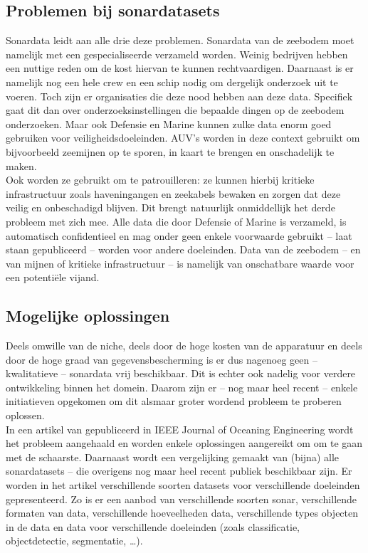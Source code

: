 \subsection{Problemen bij sonardatasets}

Sonardata leidt aan alle drie deze problemen. Sonardata van de zeebodem moet namelijk met een gespecialiseerde  verzameld worden. Weinig bedrijven hebben een nuttige reden om de kost hiervan te kunnen rechtvaardigen. Daarnaast is er namelijk nog een hele crew en een schip nodig om dergelijk onderzoek uit te voeren. Toch zijn er organisaties die deze nood hebben aan deze data. Specifiek gaat dit dan over onderzoeksinstellingen die bepaalde dingen op de zeebodem onderzoeken. Maar ook Defensie en Marine kunnen zulke data enorm goed gebruiken voor veiligheidsdoeleinden. AUV's worden in deze context gebruikt om bijvoorbeeld zeemijnen op te sporen, in kaart te brengen en onschadelijk te maken. \\

Ook worden ze gebruikt om te patrouilleren: ze kunnen hierbij kritieke infrastructuur zoals haveningangen en zeekabels bewaken en zorgen dat deze veilig en onbeschadigd blijven. Dit brengt natuurlijk onmiddellijk het derde probleem met zich mee. Alle data die door Defensie of Marine is verzameld, is automatisch confidentieel en mag onder geen enkele voorwaarde gebruikt -- laat staan gepubliceerd -- worden voor andere doeleinden. Data van de zeebodem -- en van mijnen of kritieke infrastructuur -- is namelijk van onschatbare waarde voor een potentiële vijand. \autocite{Aubard_2024_Datasets}

\subsection{Mogelijke oplossingen}

Deels omwille van de niche, deels door de hoge kosten van de apparatuur en deels door de hoge graad van gegevensbescherming is er dus nagenoeg geen -- kwalitatieve -- sonardata vrij beschikbaar. Dit is echter ook nadelig voor verdere ontwikkeling binnen het domein. Daarom zijn er -- nog maar heel recent -- enkele initiatieven opgekomen om dit alsmaar groter wordend probleem te proberen oplossen. \\

In een artikel van \textcite{Aubard_2024_Datasets} gepubliceerd in IEEE Journal of Oceaning Engineering wordt het probleem aangehaald en worden enkele oplossingen aangereikt om om te gaan met de schaarste. Daarnaast wordt een vergelijking gemaakt van (bijna) alle sonardatasets -- die overigens nog maar heel recent publiek beschikbaar zijn. Er worden in het artikel verschillende soorten datasets voor verschillende doeleinden gepresenteerd. Zo is er een aanbod van verschillende soorten sonar, verschillende formaten van data, verschillende hoeveelheden data, verschillende types objecten in de data en data voor verschillende doeleinden (zoals classificatie, objectdetectie, segmentatie, \dots). \\

